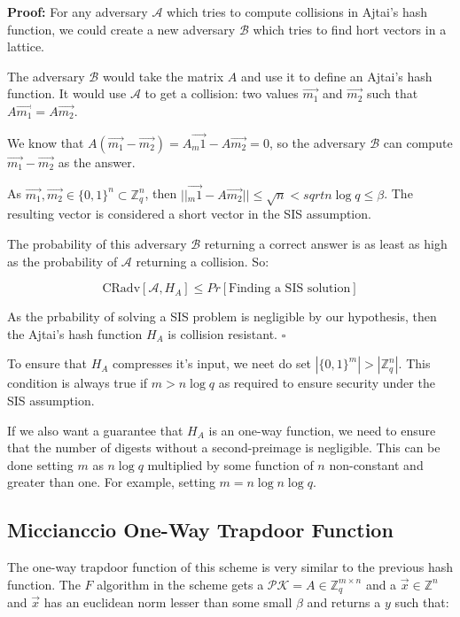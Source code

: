 \documentclass[a4paper]{article}
\newcommand*{\qed}{\hfill\ensuremath{\square}}
\begin{document}
\textbf{Proof: } For any adversary $\mathcal{A}$ which tries to
compute collisions in Ajtai's hash function, we could create a new
adversary $\mathcal{B}$ which tries to find hort vectors in a lattice.

The adversary $\mathcal{B}$ would take the matrix $A$ and use it to
define an Ajtai's hash function. It would use $\mathcal{A}$ to get a
collision: two values $\overrightarrow{m_1}$ and
$\overrightarrow{m_2}$ such that
$A\overrightarrow{m_1}=A\overrightarrow{m_2}$.

We know that $A(\overrightarrow{m_1}-\overrightarrow{m_2}) =
A\overrightarrow{_m1}-A\overrightarrow{m_2} = 0$, so the adversary
$\mathcal{B}$ can compute $\overrightarrow{m_1}-\overrightarrow{m_2}$
as the answer.

As $\overrightarrow{m_1},\overrightarrow{m_2}\in \{0,1\}^n \subset
\mathbb{Z}_q^n$, then
$||\overrightarrow{_m1}-A\overrightarrow{m_2}||\leq\sqrt{n}<sqrt{n\log
  q \leq \beta}$. The resulting vector is considered a short vector in
the SIS assumption.

The probability of this adversary $\mathcal{B}$ returning a correct
answer is as least as high as the probability of $\mathcal{A}$
returning a collision. So:

$$
\textrm{CRadv}[\mathcal{A}, H_A] \leq Pr[\textrm{Finding\ a\ SIS\ solution}]
$$

As the prbability of solving a SIS problem is negligible by our
hypothesis, then the Ajtai's hash function $H_A$ is collision
resistant. \qed

To ensure that $H_A$ compresses it's input, we neet do set
$|\{0,1\}^m|>|\mathbb{Z}_q^n|$. This condition is always true if $m>n
\log q$ as required to ensure security under the SIS assumption.

If we also want a guarantee that $H_A$ is an one-way function, we need
to ensure that the number of digests without a second-preimage is
negligible. This can be done setting $m$ as $n \log q$ multiplied by
some function of $n$ non-constant and greater than one. For example,
setting $m = n\log n\log q$.


\subsection{Miccianccio One-Way Trapdoor Function}
 
The one-way trapdoor function of this scheme is very similar to the
previous hash function. The $F$ algorithm in the scheme gets a
$\mathcal{PK} = A \in \mathbb{Z}_q^{m \times n}$ and a
$\overrightarrow{x} \in \mathbb{Z}^n$ and $\overrightarrow{x}$ has an
euclidean norm lesser than some small $\beta$ and returns a $y$ such
that:
\end{document}
